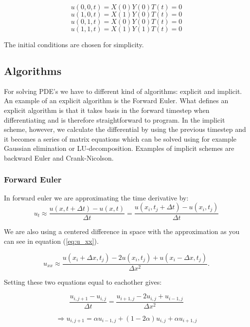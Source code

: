 \documentclass[a4paper,10pt]{article}
\begin{document}
\[ u(0,0,t) = X(0)Y(0)T(t) = 0 \]
\[ u(1,0,t) = X(1)Y(0)T(t) = 0 \]
\[ u(0,1,t) = X(0)Y(0)T(t) = 0 \]
\[ u(1,1,t) = X(1)Y(1)T(t) = 0 \]

The initial conditions are chosen for simplicity.

\subsection{Algorithms}
For solving PDE's we have to different kind of algorithms: explicit and implicit. An example of an explicit algorithm is the Forward Euler.
What defines an explicit algorithm is that it takes basis in the forward timestep when differentiating and is therefore straightforward to program.
In the implicit scheme, however, we calculate the differential by using the previous timestep and it becomes a series of matrix equations which can be solved 
using for example Gaussian elimination or LU-decomposition. Examples of implicit schemes are backward Euler and Crank-Nicolson.

\subsubsection{Forward Euler}

In forward euler we are approximating the time derivative by:
\begin{equation}
u_t\approx \frac{u(x,t+\Delta t)-u(x,t)}{\Delta t}=\frac{u(x_i,t_j+\Delta t)-u(x_i,t_j)}{\Delta t}
\label{eq:forward_euler}
\end{equation}

We are also using a centered difference in space with the approximation as you can see in equation (\ref{eq:u_xx}). 

\begin{equation}
u_{xx}\approx \frac{u(x_i+\Delta x,t_j)-2u(x_i,t_j)+u(x_i-\Delta x,t_j)}{\Delta x^2}.
\label{eq:u_xx}
\end{equation}

Setting these two equations equal to eachother gives:
 
\begin{equation}
\frac{u_{i,j+1} - u_{i,j}}{\Delta t} = \frac{u_{i+1,j} - 2u_{i,j} + u_{i-1,j}}{\Delta x^2} 
\end{equation}

\begin{equation}
 \Rightarrow u_{i,j+1} = \alpha u_{i-1,j} + (1 -2\alpha)u_{i,j} + \alpha u_{i+1,j}
 \label{eq:Forward_eulerScheme}
\end{equation}
\end{document}
